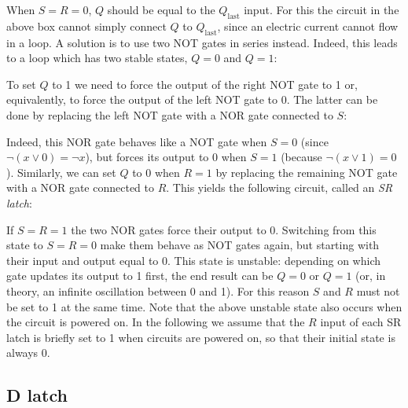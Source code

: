 \begin{center}
  
\end{center}

When $S=R=0$, $Q$ should be equal to the $Q_\mathrm{last}$ input. For this the
circuit in the above box cannot simply connect $Q$ to $Q_\mathrm{last}$, since
an electric current cannot flow in a loop. A solution is to use two NOT gates
in series instead. Indeed, this leads to a loop which has two stable states,
$Q=0$ and $Q=1$:

\begin{center}
  
\end{center}

To set $Q$ to 1 we need to force the output of the right NOT gate to 1 or,
equivalently, to force the output of the left NOT gate to 0. The latter can be
done by replacing the left NOT gate with a NOR gate connected to $S$:

\begin{center}
  
\end{center}

Indeed, this NOR gate behaves like a NOT gate when $S=0$ (since $\neg (x \vee
0) = \neg x$), but forces its output to 0 when $S=1$ (because $\neg (x \vee 1)
= 0$). Similarly, we can set $Q$ to 0 when $R=1$ by replacing the remaining NOT
gate with a NOR gate connected to $R$. This yields the following circuit,
called an {\em SR latch}:

\begin{center}
  
\end{center}

If $S=R=1$ the two NOR gates force their output to 0. Switching from this state
to $S=R=0$ make them behave as NOT gates again, but starting with their input
and output equal to 0. This state is unstable: depending on which gate updates
its output to 1 first, the end result can be $Q=0$ or $Q=1$ (or, in theory, an
infinite oscillation between 0 and 1). For this reason $S$ and $R$ must not be
set to 1 at the same time. Note that the above unstable state also occurs when
the circuit is powered on. In the following we assume that the $R$ input of
each SR latch is briefly set to 1 when circuits are powered on, so that their
initial state is always 0.

\subsection{D latch}


